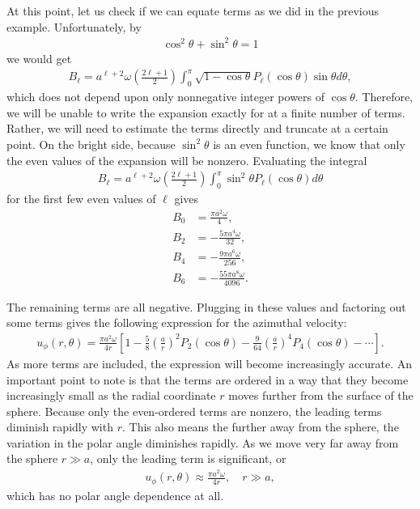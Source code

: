 At this point, let us check if we can equate terms as we did in the previous example. Unfortunately, by
\begin{align}
  \cos^2 \theta + \sin^2 \theta = 1 \nonumber
\end{align}
we would get 
\begin{align}
  B_\ell  = a^{\ell+2} \omega \left( \frac{ 2 \ell + 1 }{2 } \right) \int_0^\pi \sqrt{ 1 - \cos \theta } P_\ell(\cos \theta) \sin \theta d\theta , \nonumber
\end{align}
which does not depend upon only nonnegative integer powers of $\cos \theta$. Therefore, we will be unable to write the expansion exactly for at a finite number of terms. Rather, we will need to estimate the terms directly and truncate at a certain point. On the bright side, because $\sin^2 \theta$ is an even function, we know that only the even values of the expansion will be nonzero. Evaluating the integral
\begin{align}
  B_\ell  = a^{\ell+2} \omega \left( \frac{ 2 \ell + 1 }{2 } \right) \int_0^\pi \sin^2 \theta P_\ell(\cos \theta)  d\theta
\end{align}
for the first few even values of $\ell$ gives
\begin{subequations}
\begin{align}
  B_0 &= \frac{ \pi a^2 \omega }{ 4 } , \\
  B_2 &= -\frac{ 5 \pi a^4 \omega }{ 32 }, \\
  B_4 &= -\frac{ 9 \pi a^6 \omega }{ 256 }, \\
  B_6 &= -\frac{ 55 \pi a^8 \omega }{ 4096 }.
\end{align}
\end{subequations}


The remaining terms are all negative. Plugging in these values and factoring out some terms gives the following expression for the azimuthal velocity:
\begin{align}
  u_\phi(r,\theta) = \frac{ \pi a^2 \omega }{ 4 r } \left[ 1 - \frac{5}{8} \left( \frac{a}{r} \right)^2 P_2(\cos \theta) - \frac{9}{64} \left( \frac{a}{r} \right)^4 P_4(\cos \theta) - \cdots \right] .
\end{align}
As more terms are included, the expression will become increasingly accurate. An important point to note is that the terms are ordered in a way that they become increasingly small as the radial coordinate $r$ moves further from the surface of the sphere. Because only the even-ordered terms are nonzero, the leading terms diminish rapidly with $r$. This also means the further away from the sphere, the variation in the polar angle diminishes rapidly. As we move very far away from the sphere $r \gg a$, only the leading term is significant, or
\begin{align}
  u_\phi(r,\theta) \approx \frac{ \pi a^2 \omega }{ 4 r } , \quad r \gg a, \nonumber
\end{align}
which has no polar angle dependence at all.

